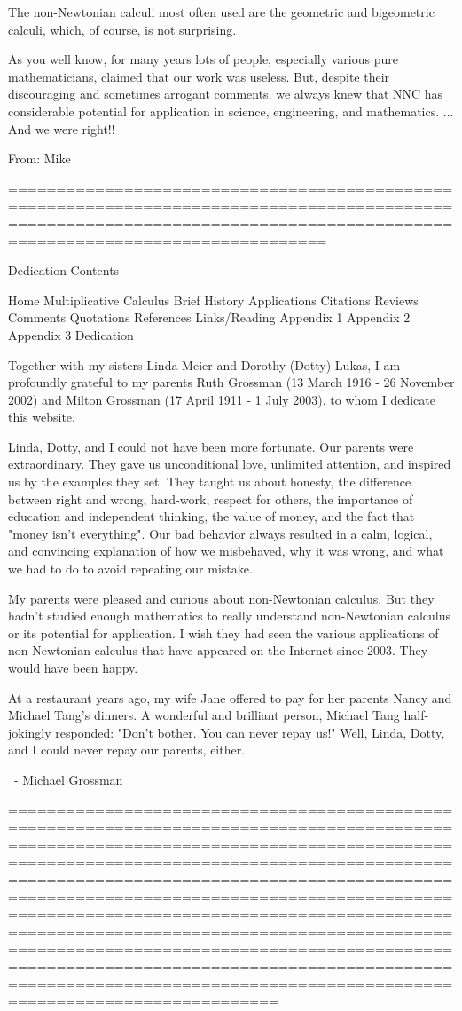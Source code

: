 \documentclass[12pt]{article}
\begin{document}
The non-Newtonian calculi most often used are the geometric and bigeometric calculi, which, of course, is not surprising.

As you well know, for many years lots of people, especially various pure mathematicians, claimed that our work was useless. But, despite their discouraging and sometimes arrogant comments, we always knew that NNC has considerable potential for application in science, engineering, and mathematics. ... And we were right!!      


From:
Mike

===========================================================================================================================================================================

Dedication
Contents

Home
Multiplicative Calculus
Brief History
Applications
Citations
Reviews
Comments
Quotations
References
Links/Reading
Appendix 1
Appendix 2
Appendix 3
Dedication

Together with my sisters Linda Meier and Dorothy (Dotty) Lukas, I am profoundly grateful to my parents Ruth Grossman (13 March 1916 - 26 November 2002) and Milton Grossman (17 April 1911 - 1 July 2003), to whom I dedicate this website. 

Linda, Dotty, and I could not have been more fortunate. Our parents were extraordinary. They gave us unconditional love, unlimited attention, and inspired us by the examples they set. They taught us about honesty, the difference between right and wrong, hard-work, respect for others, the importance of education and independent thinking, the value of money, and the fact that "money isn't everything". Our bad behavior always resulted in a calm, logical, and convincing explanation of how we misbehaved, why it was wrong, and what we had to do to avoid repeating our mistake.

My parents were pleased and curious about non-Newtonian calculus. But they hadn't studied enough mathematics to really understand non-Newtonian calculus or its potential for application. I wish they had seen the various applications of non-Newtonian calculus that have appeared on the Internet since 2003. They would have been happy.

At a restaurant years ago, my wife Jane offered to pay for her parents Nancy and Michael Tang's dinners. A wonderful and brilliant person, Michael Tang half-jokingly responded: "Don't bother. You can never repay us!" Well, Linda, Dotty, and I could never repay our parents, either.

 - Michael Grossman

======================================================================================================================================================================================================================================================================================================================================================================================================================================================================================================================================================
\end{document}

